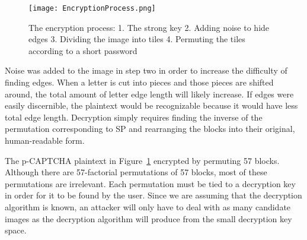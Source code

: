 \documentclass[12pt]{article}
\begin{document}
\begin{figure}
	\begin{center}
		\texttt{[image: EncryptionProcess.png]}
	\end{center}
	\caption{The encryption process: 1. The strong key 2. Adding noise to hide edges 3. Dividing the image into tiles 4. Permuting the tiles according to a short password}
\label{EncryptionProcess}
\end{figure}


	Noise was added to the image in step two in order to increase the difficulty of finding edges. When a letter is cut into pieces and those pieces are shifted around, the total amount of letter edge length will likely increase. If edges were easily discernible, the plaintext would be recognizable because it would have less total edge length. Decryption simply requires finding the inverse of the permutation corresponding to SP and rearranging the blocks into their original, human-readable form.

	The p-CAPTCHA plaintext in Figure~{\ref{EncryptionProcess}} encrypted by permuting 57 blocks. Although there are 57-factorial permutations of 57 blocks, most of these permutations are irrelevant. Each permutation must be tied to a decryption key in order for it to be found by the user. Since we are assuming that the decryption algorithm is known, an attacker will only have to deal with as many candidate images as the decryption algorithm will produce from the small decryption key space.
\end{document}
